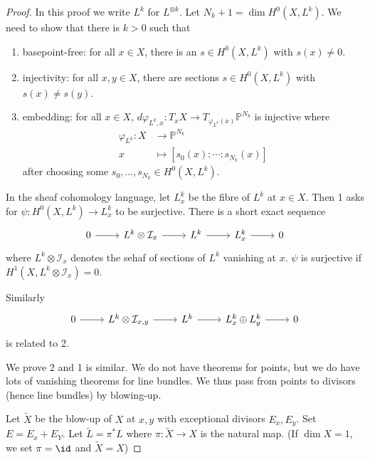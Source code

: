\documentclass[a4paper]{article}
\renewcommand{\P}{\mathbb P} %
\begin{document}
\begin{proof}
  In this proof we write \(L^k\) for \(L^{\otimes k}\). Let \(N_k + 1 = \dim H^0(X, L^k)\). We need to show that there is \(k > 0\) such that
  \begin{enumerate}
  \item basepoint-free: for all \(x \in X\), there is an \(s \in H^0(X, L^k)\) with \(s(x) \neq 0\).
  \item injectivity: for all \(x, y \in X\), there are sections \(s \in H^0(X, L^k)\) with \(s(x) \neq s(y)\).
  \item embedding: for all \(x \in X\), \(d \varphi_{L^k, x}: T_xX \to T_{\varphi_{L^k}(x)} \P^{N_k}\) is injective where
    \begin{align*}
      \varphi_{L^k}: X &\to \P^{N_k} \\
      x &\mapsto [s_0(x): \cdots : s_{N_k}(x)]
    \end{align*}
    after choosing some \(s_0, \dots, s_{N_k} \in H^0(X, L^k)\).
  \end{enumerate}
  In the sheaf cohomology language, let \(L^k_x\) be the fibre of \(L^k\) at \(x \in X\). Then 1 asks for \(\psi: H^0(X, L^k) \to L^k_x\) to be surjective. There is a short exact sequence
  \[
    \begin{tikzcd}
      0 \ar[r] & L^k \otimes \mathcal I_x \ar[r] & L^k \ar[r] & L^k_x \ar[r] & 0
    \end{tikzcd}
  \]
  where \(L^k \otimes \mathcal I_x\) denotes the sehaf of sections of \(L^k\) vanishing at \(x\). \(\psi\) is surjective if \(H^1(X, L^k \otimes \mathcal I_x) = 0\).

  Similarly
  \[
    \begin{tikzcd}
      0 \ar[r] & L^k \otimes \mathcal I_{x, y} \ar[r] & L^k \ar[r] & L_x^k \oplus L_y^k \ar[r] & 0
    \end{tikzcd}
  \]
  is related to 2.

  We prove 2 and 1 is similar. We do not have theorems for points, but we do have lots of vanishing theorems for line bundles. We thus pass from points to divisors (hence line bundles) by blowing-up.

  Let \(\tilde X\) be the blow-up of \(X\) at \(x, y\) with exceptional divisors \(E_x, E_y\). Set \(E = E_x + E_Y\). Let \(\tilde L = \pi^* L\) where \(\pi: \tilde X \to X\) is the natural map. (If \(\dim X = 1\), we set \(\pi = \id\) and \(\tilde X = X\))


\end{proof}
\end{document}
